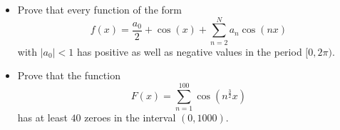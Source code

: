 \begin{itemize}
\item[(a)] Prove that every function of the form
\[f(x)=\frac{a_{0}}{2}+\cos(x)+\sum_{n=2}^{N}a_{n}\cos(nx)\]with \(|a_{0}|<1\) has positive as well as negative values in the period \([0,2\pi)\).
\item[(b)] Prove that the function
\[F(x)=\sum_{n=1}^{100}\cos(n^{\frac{3}{2}}x)\]has at least \(40\) zeroes in the interval \((0,1000)\).
\end{itemize}
